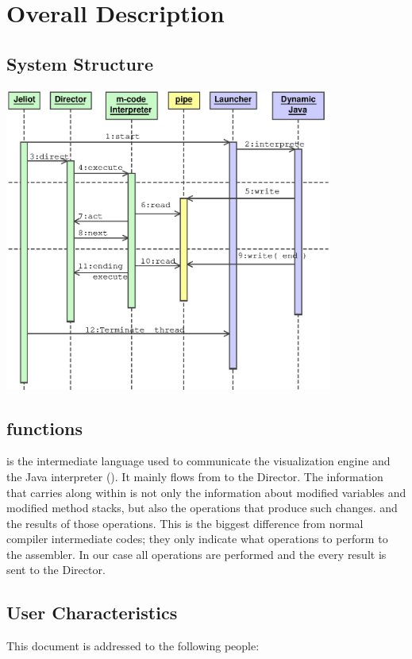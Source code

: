 \chapter{Overall Description}
\label{ch:overall}

\section{\jel{} System Structure}
\label{sec:structure}
\includegraphics[height=10cm]{communicationmodel.eps}
\section{\mcode{} functions}
\label{sec:functions}
\mcode{} is the intermediate language used to communicate the visualization engine and the Java interpreter (\djava{}). It mainly flows from \djava{}to the Director.  The information that carries along within is not only the information about modified variables and modified method stacks, but also the operations that produce such changes. and the results of those operations. This is the biggest difference from normal compiler intermediate codes; they only indicate what operations to perform to the assembler. In our case all operations are performed and the every result is sent to the Director.

\section{User Characteristics}
\label{sec:users}

This document is addressed to the following people:

